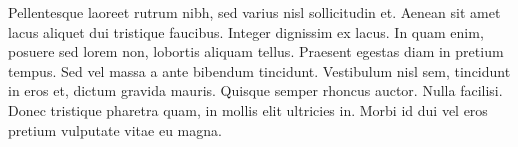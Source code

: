 Pellentesque laoreet rutrum nibh, sed varius nisl sollicitudin et. Aenean sit amet lacus aliquet dui tristique faucibus. Integer dignissim ex lacus. In quam enim, posuere sed lorem non, lobortis aliquam tellus. Praesent egestas diam in pretium tempus. Sed vel massa a ante bibendum tincidunt. Vestibulum nisl sem, tincidunt in eros et, dictum gravida mauris. Quisque semper rhoncus auctor. Nulla facilisi. Donec tristique pharetra quam, in mollis elit ultricies in. Morbi id dui vel eros pretium vulputate vitae eu magna.

\fussy
